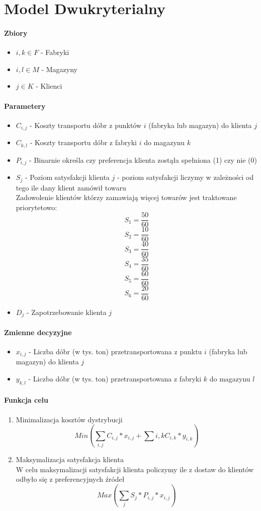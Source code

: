 \section{Model Dwukryterialny}
\paragraph{Zbiory}
\begin{itemize}
    \item $i, k \in F$ - Fabryki 
    \item $i, l \in M$ - Magazyny 
    \item $j \in K$ - Klienci
\end{itemize}
\paragraph{Parametery}
\begin{itemize}
    \item $C_{i, j}$ - Koszty transportu dóbr z punktów $i$ (fabryka lub magazyn) do klienta $j$
    \item $C_{k, l}$ - Koszty transportu dóbr z fabryki $i$ do magazynu $k$ 
    \item $P_{i, j}$ - Binarnie określa czy preferencja klienta zostąła spełniona (1) czy nie (0)
    \item $S_j$ - Poziom satysfakcji klienta $j$ - poziom satysfakcji liczymy w zależności od tego ile dany klient zamówił towaru \\ 
    Zadowolenie klientów którzy zamawiają więcej towarów jest traktowane priorytetowo:
    \[ S_1 = \frac{50}{60}  \]
    \[ S_2 = \frac{10}{60}  \]
    \[ S_3 = \frac{40}{60}  \]
    \[ S_4 = \frac{35}{60}  \]
    \[ S_5 = \frac{60}{60}  \]
    \[ S_6 = \frac{20}{60}  \]
    \item $D_j$ - Zapotrzebowanie klienta $j$
\end{itemize}
\paragraph{Zmienne decyzyjne}
\begin{itemize}
    \item $x_{i,j}$ - Liczba dóbr (w tys. ton) przetransportowana z punktu $i$ (fabryka lub magazyn) do klienta $j$
    \item $y_{k, l}$ - Liczba dóbr (w tys. ton) przetransportowana z fabryki $k$ do magazynu $l$
\end{itemize} 
\paragraph{Funkcja celu}
\begin{enumerate}
    \item Minimalizacja kosztów dystrybucji \\ 
    \[ Min(\sum_{i, j} C_{i, j} * x_{i, j} + \sum{i, k} C_{i, k} * y_{i, k}) \]
    \item Maksymalizacja satysfakcja klienta \\ 
    W celu maksymalizacji satysfakcji klienta policzymy ile z dostaw do klientów odbyło się z preferencyjnych źródeł \\
    \[ Max(\sum_{j} S_j * P_{i,j} * x_{i, j}) \] 
\end{enumerate}
